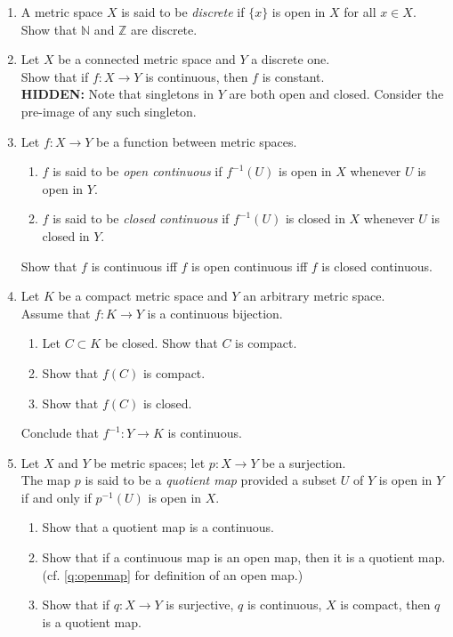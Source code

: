 \documentclass[12pt]{article}
\theoremstyle{definition}
\numberwithin{thm}{section}
\newcommand{\hint}[1]{\textbf{HIDDEN:} {\color[rgb]{0.95, 0.95, 0.95}#1}}
\begin{document}
\begin{enumerate}
	\item A metric space $X$ is said to be \emph{discrete} if $\{x\}$ is open in $X$ for all $x \in X.$\\
	Show that $\mathbb{N}$ and $\mathbb{Z}$ are discrete.
	\item Let $X$ be a connected metric space and $Y$ a discrete one.\\
	Show that if $f:X \to Y$ is continuous, then $f$ is constant.\\
	\hint{Note that singletons in $Y$ are both open and closed. Consider the pre-image of any such singleton.}
	\item Let $f:X\to Y$ be a function between metric spaces.
	\begin{enumerate}
		\item $f$ is said to be \emph{open continuous} if $f^{-1}(U)$ is open in $X$ whenever $U$ is open in $Y.$
		\item $f$ is said to be \emph{closed continuous} if $f^{-1}(U)$ is closed in $X$ whenever $U$ is closed in $Y.$
	\end{enumerate}
	Show that $f$ is continuous iff $f$ is open continuous iff $f$ is closed continuous.
	\item Let $K$ be a compact metric space and $Y$ an arbitrary metric space.\\
	Assume that $f:K\to Y$ is a continuous bijection.
	\begin{enumerate}
		\item Let $C \subset K$ be closed. Show that $C$ is compact.
		\item Show that $f(C)$ is compact.
		\item Show that $f(C)$ is closed.
	\end{enumerate}
	Conclude that $f^{-1}:Y \to K$ is continuous.
	\item Let $X$ and $Y$ be metric spaces; let $p: X \to Y$ be a surjection.\\
	The map $p$ is said to be a \emph{quotient map} provided a subset $U$ of $Y$ is open in $Y$ if and only if $p^{-1}(U)$ is open in $X.$
	\begin{enumerate}
		\item Show that a quotient map is a continuous.
		\item Show that if a continuous map is an open map, then it is a quotient map. (cf. \ref{q:openmap} for definition of an open map.)	
		\item Show that if $q:X \to Y$ is surjective, $q$ is continuous, $X$ is compact, then $q$ is a quotient map.

\end{enumerate}
\end{enumerate}
\end{document}
